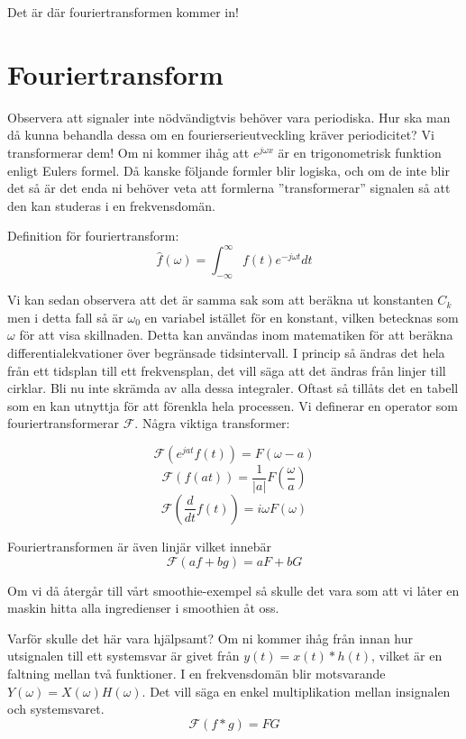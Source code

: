 \documentclass{article}
\begin{document}
Det är där fouriertransformen kommer in!

\section{Fouriertransform}

Observera att signaler inte nödvändigtvis behöver vara periodiska. Hur ska man då kunna behandla dessa om en fourierserieutveckling kräver periodicitet? Vi transformerar dem! Om ni kommer ihåg att $e^{j\omega x}$ är en trigonometrisk funktion enligt Eulers formel. Då kanske följande formler blir logiska, och om de inte blir det så är det enda ni behöver veta att formlerna ''transformerar'' signalen så att den kan studeras i en frekvensdomän.

Definition för fouriertransform:
\[\hat{f}(\omega) = \int_{-\infty}^{\infty} f(t) e^{-j \omega t} dt\]

Vi kan sedan observera att det är samma sak som att beräkna ut konstanten $C_k$ men i detta fall så är $\omega_0$ en variabel istället för en konstant, vilken betecknas som $\omega$ för att visa skillnaden. 
Detta kan användas inom matematiken för att beräkna differentialekvationer över begränsade tidsintervall. I princip så ändras det hela från ett tidsplan till ett frekvensplan, det vill säga att det ändras från linjer till cirklar. %
Bli nu inte skrämda av alla dessa integraler. Oftast så tillåts det en tabell som en kan utnyttja för att förenkla hela processen. Vi definerar en operator som fouriertransformerar $\mathcal{F}$. Några viktiga transformer:

\[\mathcal{F}(e^{j a t} f(t)) = F(\omega - a)\]%
\[\mathcal{F}(f(at)) = \frac{1}{|a|}F(\frac{\omega}{a})\]%
\[\mathcal{F}(\frac{d}{dt} f(t)) = i\omega F(\omega) \]%

Fouriertransformen är även linjär vilket innebär
$$\mathcal{F}(a f + b g) = a F + b G$$

Om vi då återgår till vårt smoothie-exempel så skulle det vara som att vi låter en maskin hitta alla ingredienser i smoothien åt oss.

Varför skulle det här vara hjälpsamt? Om ni kommer ihåg från innan hur utsignalen till ett systemsvar är givet från $y(t) = x(t) * h(t)$, vilket är en faltning mellan två funktioner. I en frekvensdomän blir motsvarande $Y(\omega) = X(\omega) H(\omega)$. Det vill säga en enkel multiplikation mellan insignalen och systemsvaret.
\[\mathcal{F}(f*g) = F G \]
\end{document}
